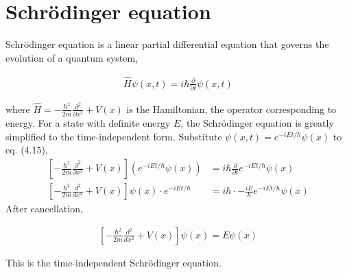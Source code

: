 \documentclass[12pt]{book} %
\numberwithin{equation}{chapter}
\def\p{\partial}
\begin{document}
\section{Schr\"{o}dinger equation}
Schr\"{o}dinger equation is a linear partial differential equation that governs the evolution of a quantum system,
\begin{eqnbox}
\begin{align}
\hat{H}\psi(x, t)=i\hbar\frac{\p}{\p t}\psi(x, t)
\end{align}
\end{eqnbox}
where $\hat{H}=-\frac{\hbar^{2}}{2m}\frac{\p^{2}}{\p x^{2}}+V(x)$ is the Hamiltonian, the operator corresponding to energy.\bigskip\newline
For a state with definite energy $E$, the Schr\"{o}dinger equation is greatly simplified to the time-independent form. Substitute $\psi(x, t)=e^{-iEt/\hbar}\psi(x)$ to eq. (4.15),
\begin{align*}
\left[-\frac{\hbar^{2}}{2m}\frac{\p^{2}}{\p x^{2}}+V(x)\right]\left(e^{-iEt/\hbar}\psi(x)\right)&=i\hbar\frac{\p}{\p t}e^{-iEt/\hbar}\psi(x)\\
\left[-\frac{\hbar^{2}}{2m}\frac{d^{2}}{dx^{2}}+V(x)\right]\psi(x)\cdot e^{-iEt/\hbar}&=i\hbar\cdot-\frac{iE}{\hbar}e^{-iEt/\hbar}\psi(x)
\end{align*}
After cancellation,
\begin{eqnbox}
\begin{align}
\left[-\frac{\hbar^{2}}{2m}\frac{d^{2}}{dx^{2}}+V(x)\right]\psi(x)=E\psi(x)
\end{align}
\end{eqnbox}
This is the time-independent Schr\"{o}dinger equation.
\end{document}

